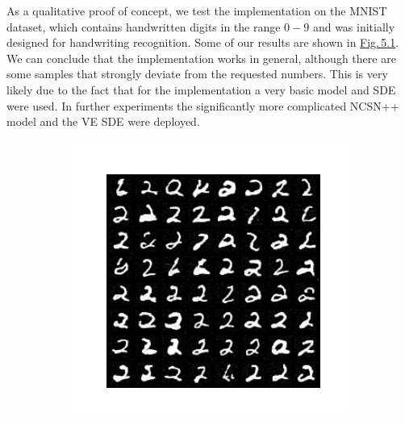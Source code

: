 As a qualitative proof of concept, we test the implementation on the MNIST \cite{mnist} dataset, which contains handwritten digits in the range $0-9$ and was initially designed for handwriting recognition. Some of our results are shown in \hyperref[fig:5.1]{Fig.\,5.1}. We can conclude that the implementation works in general, although there are some samples that strongly deviate from the requested numbers. This is very likely due to the fact that for the implementation a very basic model and SDE were used. In further experiments the significantly more complicated NCSN++ model and the VE SDE were deployed.
%
\begin{figure}
    \begin{subfigure}{0.3\textwidth} \label{abb:1a}
        \centering
        \includegraphics[width=\textwidth]{Chapters/figures/experiments/mnist/mnist_2.png}
    \end{subfigure}
    \begin{subfigure}{0.3\textwidth} \label{abb:1a}
        \centering

\end{subfigure}
\end{figure}
